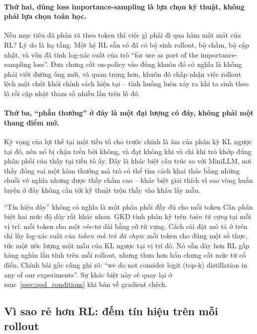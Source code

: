 \paragraph{Thứ hai, dùng loss importance-sampling là lựa chọn kỹ thuật, không phải lựa chọn toán học.} Nếu mục tiêu đã phân rã theo token thì việc gì phải đi qua hàm mất mát của RL? Lý do là hạ tầng. Một hệ RL sẵn có đã có bộ sinh rollout, bộ chấm, bộ cập nhật, và vốn đã tính log-xác suất của trò ``for use as part of the importance-sampling loss''. Đưa chưng cất on-policy vào đúng khuôn đó có nghĩa là không phải viết đường ống mới, và quan trọng hơn, khuôn đó chấp nhận việc rollout lệch một chút khỏi chính sách hiện tại -- tình huống luôn xảy ra khi ta sinh theo lô rồi cập nhật tham số nhiều lần trên lô đó.

\paragraph{Thứ ba, ``phần thưởng'' ở đây là một đại lượng có đáy, không phải một thang điểm mở.} Kỳ vọng của lợi thế tại một tiền tố cho trước chính là âm của phân kỳ KL ngược tại đó, nên nó bị chặn trên bởi không, và đạt không khi và chỉ khi trò khớp đúng phân phối của thầy tại tiền tố ấy. Đây là khác biệt cấu trúc so với MiniLLM, nơi thầy đóng vai một hàm thưởng mà trò có thể tìm cách khai thác bằng những chuỗi vô nghĩa nhưng được thầy chấm cao -- khác biệt giải thích vì sao vòng huấn luyện ở đây không cần tới kỹ thuật trộn thầy vào khâu lấy mẫu.

\begin{pitfall}{``Tín hiệu dày'' không có nghĩa là một phân phối đầy đủ cho mỗi token}
Cần phân biệt hai mức độ dày rất khác nhau. GKD tính phân kỳ trên \emph{toàn từ vựng} tại mỗi vị trí: mỗi token cho một véc-tơ dài bằng cỡ từ vựng. Cách cài đặt mô tả ở trên chỉ lấy log-xác suất của \emph{token mà trò đã chọn}: mỗi token cho đúng một số thực, tức một ước lượng một mẫu của KL ngược tại vị trí đó. Nó vẫn dày hơn RL gấp hàng nghìn lần tính trên mỗi rollout, nhưng thưa hơn hẳn chưng cất mức từ cổ điển. Chính bài gốc cũng ghi rõ: ``we do not consider logit (top-k) distillation in any of our experiments''. Sự khác biệt này sẽ quay lại ở mục~\ref{ssec:opd_conditions} khi bàn về gradient chệch.
\end{pitfall}

\subsection{Vì sao rẻ hơn RL: đếm tín hiệu trên mỗi rollout}
\label{ssec:opd_vs_rl_cost}


